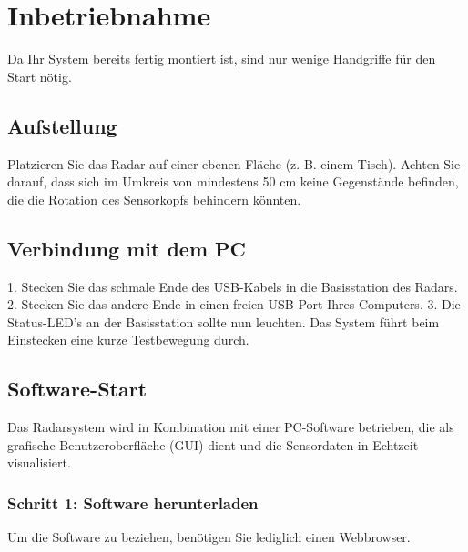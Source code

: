 %
%

\chapter{Inbetriebnahme}
Da Ihr System bereits fertig montiert ist, sind nur wenige Handgriffe für den Start nötig.

\section{Aufstellung}
Platzieren Sie das Radar auf einer ebenen Fläche (z. B. einem Tisch). Achten Sie darauf, dass sich im Umkreis von mindestens 50 cm keine Gegenstände befinden, die die Rotation des Sensorkopfs behindern könnten.

\section{Verbindung mit dem PC}
1. Stecken Sie das schmale Ende des USB-Kabels in die Basisstation des Radars.
2. Stecken Sie das andere Ende in einen freien USB-Port Ihres Computers.
3. Die Status-LED's an der Basisstation sollte nun leuchten. Das System führt beim Einstecken eine kurze Testbewegung durch.

\section{Software-Start}

Das Radarsystem wird in Kombination mit einer PC-Software betrieben, die als grafische Benutzeroberfläche (GUI) dient und die Sensordaten in Echtzeit visualisiert. 

\subsection*{Schritt 1: Software herunterladen}
Um die Software zu beziehen, benötigen Sie lediglich einen Webbrowser.

